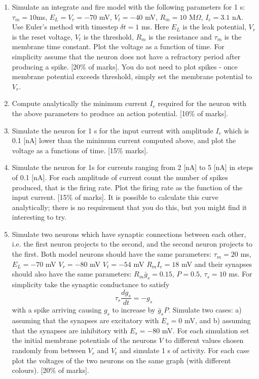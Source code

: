 \documentclass[11pt,a4paper]{scrartcl}
\begin{document}
\begin{enumerate}

\item Simulate an integrate and fire model with the following
  parameters for 1 s: $\tau_m = 10 $ms, $E_L = V_r = -70$ mV, $V_t =
  -40$ mV, $R_m= 10$ M$\Omega$, $I_e = 3.1 $ nA. Use Euler's method
  with timestep $\delta t = 1$ ms. Here $E_L$ is the leak potential,
  $V_r$ is the reset voltage, $V_t$ is the threshold, $R_m$ is the
  resistance and $\tau_m$ is the membrane time constant. Plot the
  voltage as a function of time. For simplicity assume that the neuron
  does not have a refractory period after producing a spike. [20\% of
    marks]. You do not need to plot spikes - once membrane potential
  exceeds threshold, simply set the membrane potential to $V_r$.

\item Compute analytically the minimum current $I_e$ required for the
  neuron with the above parameters to produce an action
  potential. [10\% of marks].

\item Simulate the neuron for 1 s for the input current with amplitude
  $I_e$ which is 0.1 [nA] lower than the minimum current computed
  above, and plot the voltage as a functions of time. [15\% marks].

\item Simulate the neuron for 1s for currents ranging from 2 [nA] to 5
  [nA] in steps of 0.1 [nA]. For each amplitude of current count the
  number of spikes produced, that is the firing rate. Plot the firing
  rate as the function of the input current. [15\% of marks]. It is
  possible to calculate this curve analytically; there is no
  requirement that you do this, but you might find it interesting to
  try.

\item Simulate two neurons which have synaptic connections between each other, i.e. the first neuron projects to the second, and the second neuron projects to the first. Both model neurons should have the same parameters: $\tau_m = 20$ ms, $E_L = -70$ mV $V_r = -80$ mV $V_t = -54$ mV $R_mI_e = 18$ mV and their synapses should also have the same parameters: $R_m \bar{g}_s = 0.15$, $P = 0.5$, $\tau_s= 10$ ms. For simplicity take the synaptic conductance to satisfy
\begin{equation}
\tau_s\frac{dg_s}{dt}=-g_s
\end{equation}
with a spike arriving causing $g_s$ to increase by $\bar{g}_sP$. Simulate two cases: a) assuming that the synapses are excitatory with $E_s = 0$ mV, and b) assuming that the synapses are inhibitory with $E_s = -80$ mV. For each simulation set the initial membrane potentials of the neurons $V$ to different values chosen randomly from between $V_r$ and $V_t$ and simulate 1 s of activity. For each case plot the voltages of the two neurons on the same graph (with different colours). [20\% of marks].


\end{enumerate}
\end{document}
